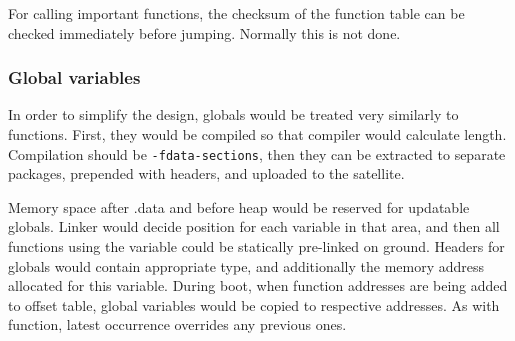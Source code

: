 For calling important functions, the checksum of the function table can be checked immediately before jumping. Normally this is not done.

\subsubsection{Global variables}

In order to simplify the design, globals would be treated very similarly to functions. First, they would be compiled so that compiler would calculate length. Compilation should be \texttt{-fdata-sections}, then they can be extracted to separate packages, prepended with headers, and uploaded to the satellite.

Memory space after .data and before heap would be reserved for updatable globals. Linker would decide position for each variable in that area, and then all functions using the variable could be statically pre-linked on ground. Headers for globals would contain appropriate type, and additionally the memory address allocated for this variable. During boot, when function addresses are being added to offset table, global variables would be copied to respective addresses. As with function, latest occurrence overrides any previous ones.

